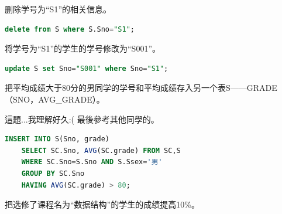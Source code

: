 \documentclass[12pt, a4paper]{report}
\begin{document}
删除学号为“S1”的相关信息。\\

\begin{lstlisting}[language=SQL]
    delete from S where S.Sno="S1";
\end{lstlisting}

\begin{figure}[H] %
    \centering %
\end{figure}
将学号为“S1”的学生的学号修改为“S001”。\\

\begin{lstlisting}[language=SQL]
    update S set Sno="S001" where Sno="S1";
\end{lstlisting}

\begin{figure}[H] %
    \centering %
\end{figure}

把平均成绩大于80分的男同学的学号和平均成绩存入另一个表S——GRADE（SNO，AVG\_GRADE）。

這題...我理解好久:( 最後參考其他同學的。\\

\begin{lstlisting}[language=SQL]
    INSERT INTO S(Sno, grade)
    SELECT SC.Sno, AVG(SC.grade) FROM SC,S 
    WHERE SC.Sno=S.Sno AND S.Ssex='男' 
    GROUP BY SC.Sno
    HAVING AVG(SC.grade) > 80;
\end{lstlisting}

把选修了课程名为“数据结构”的学生的成绩提高10\%。\\
\end{document}
